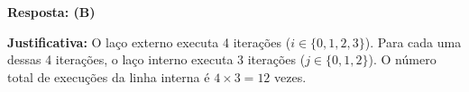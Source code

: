 \ifmostrarGabarito
\textbf{Resposta: (B)}

\textbf{Justificativa:}
O laço externo executa 4 iterações ($i \in \{0, 1, 2, 3\}$). Para cada uma dessas 4 iterações, o laço interno executa 3 iterações ($j \in \{0, 1, 2\}$). O número total de execuções da linha interna é $4 \times 3 = 12$ vezes.

\fi
